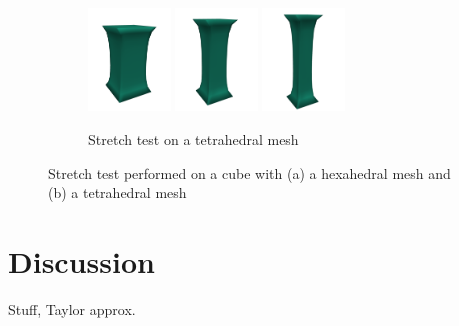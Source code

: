 \begin{figure}[!htbp]
\begin{subfigure}[b]{\textwidth}
        \hfill
        \includegraphics[width=0.24\textwidth]{resources/tetcli_08.png}
        \hfill
        \includegraphics[width=0.24\textwidth]{resources/tetcli_16.png}
        \hfill
        \includegraphics[width=0.24\textwidth]{resources/tetcli_24.png}
        \caption{Stretch test on a tetrahedral mesh}
    \end{subfigure}
    \caption[Stretch test performed on a cube]{Stretch test performed on a cube with (a) a hexahedral mesh and (b) a tetrahedral mesh}
    \label{fig:stretchtest}
\end{figure}





\section{Discussion}
Stuff, Taylor approx.


